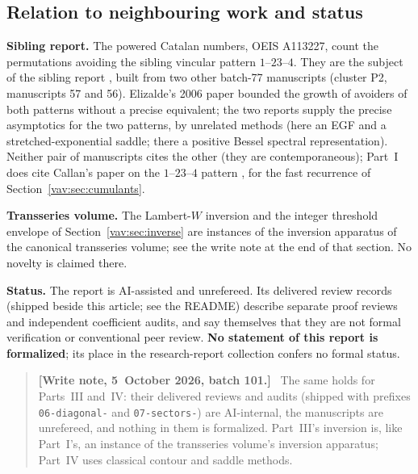 \documentclass[11pt]{article}
\theoremstyle{remark}\newtheorem{remark}[theorem]{Remark}
\newenvironment{writenoteb}{\begin{quote}\small\raggedright\textbf{[Write note, 5~October 2026, batch 101.]}\ }{\end{quote}}
\begin{document}
\subsection*{Relation to neighbouring work and status}
{\raggedright\textbf{Sibling report.} The powered Catalan numbers, OEIS A113227, count
the permutations avoiding the sibling vincular pattern $1$--$23$--$4$.
They are the subject of the sibling report
,
built from two other batch-77 manuscripts (cluster P2, manuscripts 57 and
56). Elizalde's 2006 paper \cite{elizalde} bounded the growth of
avoiders of both patterns without a precise equivalent; the two reports
supply the precise asymptotics for the two patterns, by unrelated methods
(here an EGF and a stretched-exponential saddle; there a positive Bessel
spectral representation). Neither pair of manuscripts cites the other
(they are contemporaneous); Part~I does cite Callan's paper on the
$1$--$23$--$4$ pattern \cite[Section 9]{callan}, for the fast recurrence
of Section~\ref{vav:sec:cumulants}.\par}

\textbf{Transseries volume.} The Lambert-$W$ inversion and the integer
threshold envelope of Section~\ref{vav:sec:inverse} are instances of the
inversion apparatus of the canonical transseries volume; see the write
note at the end of that section. No novelty is claimed there.

\textbf{Status.} The report is AI-assisted and unrefereed. Its delivered
review records (shipped beside this article; see the README) describe
separate proof reviews and independent coefficient audits, and say
themselves that they are not formal verification or conventional peer
review. \textbf{No statement of this report is formalized}; its place in
the research-report collection confers no formal status.
\begin{writenoteb}
The same holds for Parts~III and~IV: their delivered reviews and audits
(shipped with prefixes \texttt{06-diagonal-} and \texttt{07-sectors-}) are
AI-internal, the manuscripts are unrefereed, and nothing in them is
formalized. Part~III's inversion is, like Part~I's, an instance of the
transseries volume's inversion apparatus; Part~IV uses classical contour
and saddle methods.
\end{writenoteb}
\end{document}
